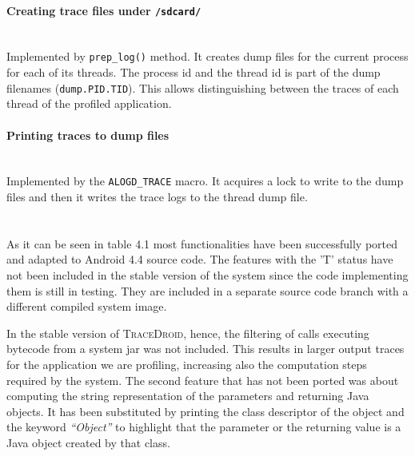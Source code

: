 \paragraph{Creating trace files under \texttt{/sdcard/}} ~\\
Implemented by \texttt{prep\_log()} method. It creates dump files for
the current process for each of its threads. The process id and the
thread id is part of the dump filenames (\texttt{dump.PID.TID}). This
allows distinguishing between the traces of each thread of the
profiled application.

\paragraph{Printing traces to dump files} ~\\
Implemented by the \texttt{ALOGD\_TRACE} macro. It acquires a lock to
write to the dump files and then it writes the trace logs to the
thread dump file.

\paragraph{} ~\\
As it can be seen in table 4.1 most functionalities have been
successfully ported and adapted to Android 4.4 source code. The
features with the 'T' status have not been included in the stable
version of the system since the code implementing them is still in
testing. They are included in a separate source code branch with a
different compiled system image.

In the stable version of \textsc{TraceDroid}, hence, the filtering of calls
executing bytecode from a system jar was not included. This results in
larger output traces for the application we are profiling, increasing
also the computation steps required by the system. The second feature
that has not been ported was about computing the string representation
of the parameters and returning Java objects. It has been substituted
by printing the class descriptor of the object and the keyword
\textit{“Object”} to highlight that the parameter or the returning value is a
Java object created by that class.
